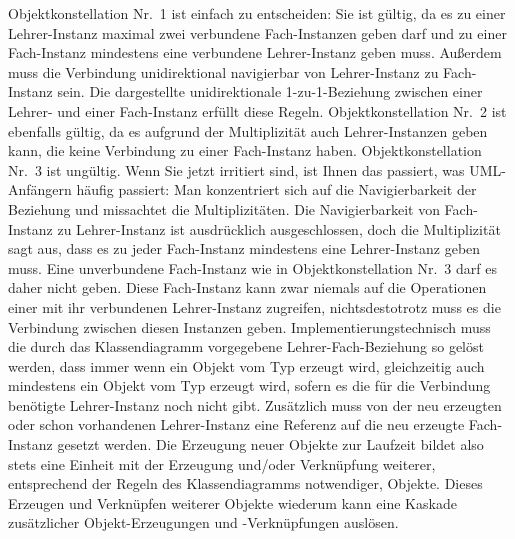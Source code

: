Objektkonstellation Nr.~1 ist einfach zu entscheiden: Sie ist gültig, da es zu einer Lehrer-Instanz maximal zwei verbundene Fach-Instanzen geben darf und zu einer Fach-Instanz mindestens eine verbundene Lehrer-Instanz geben muss. Außerdem muss die Verbindung uni\-di\-rek\-tio\-nal navigierbar von Lehrer-Instanz zu Fach-Instanz sein. Die dargestellte uni\-di\-rek\-tio\-na\-le 1-zu-1-Beziehung zwischen einer Lehrer- und einer Fach-Instanz erfüllt diese Regeln. Objektkonstellation Nr.~2 ist ebenfalls gültig, da es aufgrund der  Multiplizität auch Lehrer-Instanzen geben kann, die keine Verbindung zu einer Fach-Instanz haben. Objektkonstellation Nr.~3 ist ungültig. Wenn Sie jetzt irritiert sind, ist Ihnen das passiert, was UML-Anfängern häufig passiert: Man konzentriert sich auf die Navigierbarkeit der Beziehung und missachtet die Multiplizitäten. Die Navigierbarkeit von Fach-Instanz zu Lehrer-Instanz ist ausdrücklich ausgeschlossen, doch die Multiplizität  sagt aus, dass es zu jeder Fach-Instanz mindestens eine Lehrer-Instanz geben muss. Eine unverbun\-dene Fach-Instanz wie in Objektkonstellation Nr.~3 darf es daher nicht geben. Diese Fach-Instanz kann zwar niemals auf die Operationen einer mit ihr verbundenen Lehrer-Instanz zugreifen, nichtsdestotrotz muss es die Verbindung zwischen diesen Instanzen geben. Implementierungstechnisch muss die durch das Klassendiagramm vorgegebene Lehrer-Fach-Beziehung so gelöst werden, dass immer wenn ein Objekt vom Typ  erzeugt wird, gleichzeitig auch mindestens ein Objekt vom Typ  erzeugt wird, sofern es die für die Verbindung benötigte Lehrer-Instanz noch nicht gibt. Zusätzlich muss von der neu erzeugten oder schon vorhandenen Lehrer-Instanz eine Referenz auf die neu erzeugte Fach-Instanz gesetzt werden. Die Erzeugung neuer Objekte zur Laufzeit bildet also stets eine Einheit mit der Erzeugung und/oder Verknüpfung weiterer, entsprechend der Regeln des Klassendiagramms notwendiger, Objekte. Dieses Erzeugen und Verknüpfen weiterer Objekte wiederum kann eine Kaskade zusätzlicher Objekt-Erzeugungen und -Verknüpfungen auslösen.